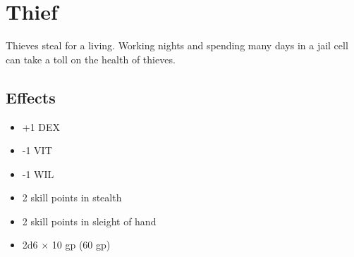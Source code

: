 \section{Thief}\label{background:thief}
Thieves steal for a living. Working nights and spending many days in a jail
cell can take a toll on the health of thieves.

\subsection{Effects}
\begin{itemize}
    \item +1 DEX
    \item -1 VIT
    \item -1 WIL
    \item 2 skill points in stealth
    \item 2 skill points in sleight of hand
    \item 2d6 $\times$ 10 gp (60 gp)
\end{itemize}
